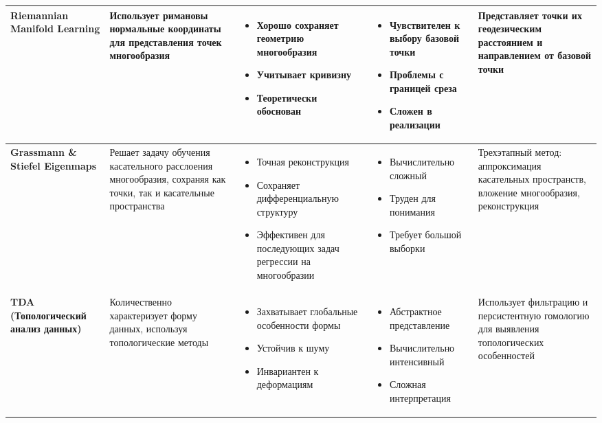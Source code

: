 \documentclass[a4paper,12pt]{article}
\begin{document}
{\begin{longtable}{|p{3.5cm}|p{3.5cm}|p{2.8cm}|p{2.8cm}|p{2.8cm}|}
\textbf{Riemannian Manifold Learning} & 
Использует римановы нормальные координаты для представления точек многообразия & 
\begin{itemize}[leftmargin=*]
    \item Хорошо сохраняет геометрию многообразия
    \item Учитывает кривизну
    \item Теоретически обоснован
\end{itemize} & 
\begin{itemize}[leftmargin=*]
    \item Чувствителен к выбору базовой точки
    \item Проблемы с границей среза
    \item Сложен в реализации
\end{itemize} & 
Представляет точки их геодезическим расстоянием и направлением от базовой точки \\
\hline

\textbf{Grassmann \& Stiefel Eigenmaps} & 
Решает задачу обучения касательного расслоения многообразия, сохраняя как точки, так и касательные пространства & 
\begin{itemize}[leftmargin=*]
    \item Точная реконструкция
    \item Сохраняет дифференциальную структуру
    \item Эффективен для последующих задач регрессии на многообразии
\end{itemize} & 
\begin{itemize}[leftmargin=*]
    \item Вычислительно сложный
    \item Труден для понимания
    \item Требует большой выборки
\end{itemize} & 
Трехэтапный метод: аппроксимация касательных пространств, вложение многообразия, реконструкция \\
\hline

\textbf{TDA (Топологический анализ данных)} & 
Количественно характеризует форму данных, используя топологические методы & 
\begin{itemize}[leftmargin=*]
    \item Захватывает глобальные особенности формы
    \item Устойчив к шуму
    \item Инвариантен к деформациям
\end{itemize} & 
\begin{itemize}[leftmargin=*]
    \item Абстрактное представление
    \item Вычислительно интенсивный
    \item Сложная интерпретация
\end{itemize} & 
Использует фильтрацию и персистентную гомологию для выявления топологических особенностей \\
\hline

\end{longtable}
}
\end{document}
